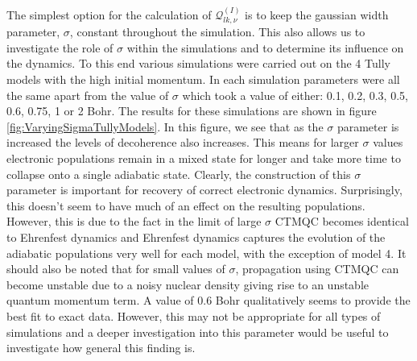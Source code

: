 \noindent The simplest option for the calculation of $\mathcal{Q}_{lk, \nu}^{(I)}$ is to keep the gaussian width parameter, $\sigma$, constant throughout the simulation. This also allows us to investigate the role of $\sigma$ within the simulations and to determine its influence on the dynamics. To this end various simulations were carried out on the 4 Tully models with the high initial momentum. In each simulation parameters were all the same apart from the value of $\sigma$ which took a value of either: 0.1, 0.2, 0.3, 0.5, 0.6, 0.75, 1 or 2 Bohr. The results for these simulations are shown in figure \ref{fig:VaryingSigmaTullyModels}. In this figure, we see that as the $\sigma$ parameter is increased the levels of decoherence also increases. This means for larger $\sigma$ values electronic populations remain in a mixed state for longer and take more time to collapse onto a single adiabatic state. Clearly, the construction of this $\sigma$ parameter is important for recovery of correct electronic dynamics. Surprisingly, this doesn't seem to have much of an effect on the resulting populations. However, this is due to the fact in the limit of large $\sigma$ CTMQC becomes identical to Ehrenfest dynamics and Ehrenfest dynamics captures the evolution of the adiabatic populations very well for each model, with the exception of model 4. It should also be noted that for small values of $\sigma$, propagation using CTMQC can become unstable due to a noisy nuclear density giving rise to an unstable quantum momentum term. A value of 0.6 Bohr qualitatively seems to provide the best fit to exact data. However, this may not be appropriate for all types of simulations and a deeper investigation into this parameter would be useful to investigate how general this finding is.

